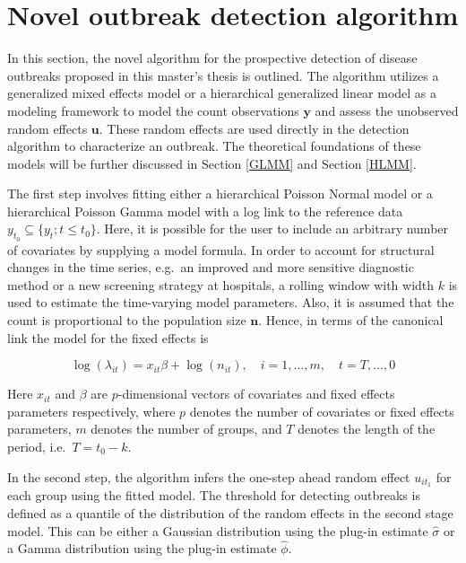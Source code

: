 \documentclass[a4paper,twoside,11pt]{report} %
\theoremstyle{definition}
\theoremstyle{definition}
\theoremstyle{definition}
\theoremstyle{definition}
\theoremstyle{remark}
\begin{document}
\section{Novel outbreak detection algorithm}\label{Novel}

In this section, the novel algorithm for the prospective detection of disease outbreaks proposed in this master's thesis is outlined. The algorithm utilizes a generalized mixed effects model or a hierarchical generalized linear model as a modeling framework to model the count observations \(\boldsymbol y\) and assess the unobserved random effects \(\boldsymbol u\). These random effects are used directly in the detection algorithm to characterize an outbreak. The theoretical foundations of these models will be further discussed in Section \ref{GLMM} and Section \ref{HLMM}.

The first step involves fitting either a hierarchical Poisson Normal model or a hierarchical Poisson Gamma model with a log link to the reference data \(y_{t_0}\subseteq \{y_t;t\leq t_0\}\). Here, it is possible for the user to include an arbitrary number of covariates by supplying a model formula. In order to account for structural changes in the time series, e.g.~an improved and more sensitive diagnostic method or a new screening strategy at hospitals, a rolling window with width \(k\) is used to estimate the time-varying model parameters. Also, it is assumed that the count is proportional to the population size \(\boldsymbol n\). Hence, in terms of the canonical link the model for the fixed effects is

\begin{equation}
  \log(\lambda_{it})=x_{it}\beta+\log(n_{it}), \quad i=1,\dots,m, \quad t=T,\dots,0
\end{equation}

Here \(x_{it}\) and \(\beta\) are \(p\)-dimensional vectors of covariates and fixed effects parameters respectively, where \(p\) denotes the number of covariates or fixed effects parameters, \(m\) denotes the number of groups, and \(T\) denotes the length of the period, i.e.~\(T=t_0-k\).

In the second step, the algorithm infers the one-step ahead random effect \(u_{i{t}_1}\) for each group using the fitted model. The threshold for detecting outbreaks is defined as a quantile of the distribution of the random effects in the second stage model. This can be either a Gaussian distribution using the plug-in estimate \(\hat{\sigma}\) or a Gamma distribution using the plug-in estimate \(\hat{\phi}\).
\end{document}
